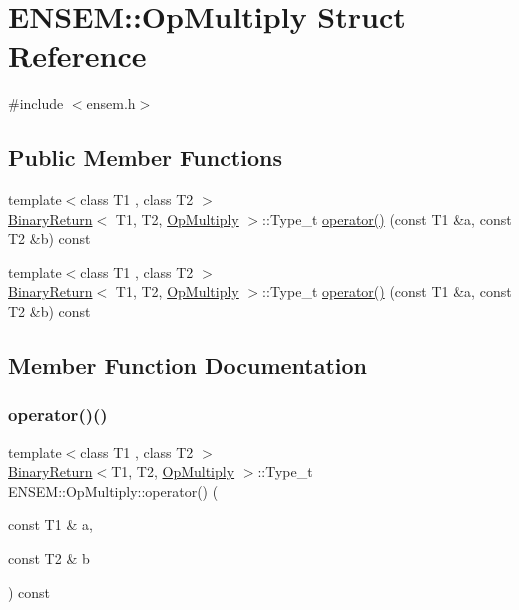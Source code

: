 \hypertarget{structENSEM_1_1OpMultiply}{}\section{E\+N\+S\+EM\+:\+:Op\+Multiply Struct Reference}
\label{structENSEM_1_1OpMultiply}


{\ttfamily \#include $<$ensem.\+h$>$}

\subsection*{Public Member Functions}
\begin{DoxyCompactItemize}
\item 
{\footnotesize template$<$class T1 , class T2 $>$ }\\\mbox{\hyperlink{structENSEM_1_1BinaryReturn}{Binary\+Return}}$<$ T1, T2, \mbox{\hyperlink{structENSEM_1_1OpMultiply}{Op\+Multiply}} $>$\+::Type\+\_\+t \mbox{\hyperlink{structENSEM_1_1OpMultiply_ae4e6438a01cae970041fa80c1cb6b594}{operator()}} (const T1 \&a, const T2 \&b) const
\item 
{\footnotesize template$<$class T1 , class T2 $>$ }\\\mbox{\hyperlink{structENSEM_1_1BinaryReturn}{Binary\+Return}}$<$ T1, T2, \mbox{\hyperlink{structENSEM_1_1OpMultiply}{Op\+Multiply}} $>$\+::Type\+\_\+t \mbox{\hyperlink{structENSEM_1_1OpMultiply_ae4e6438a01cae970041fa80c1cb6b594}{operator()}} (const T1 \&a, const T2 \&b) const
\end{DoxyCompactItemize}


\subsection{Member Function Documentation}
\mbox{\label{structENSEM_1_1OpMultiply_ae4e6438a01cae970041fa80c1cb6b594}} 
\subsubsection{\texorpdfstring{operator()()}{operator()()}\hspace{0.1cm}{\footnotesize\ttfamily [1/2]}}
{\footnotesize\ttfamily template$<$class T1 , class T2 $>$ \\
\mbox{\hyperlink{structENSEM_1_1BinaryReturn}{Binary\+Return}}$<$T1, T2, \mbox{\hyperlink{structENSEM_1_1OpMultiply}{Op\+Multiply}} $>$\+::Type\+\_\+t E\+N\+S\+E\+M\+::\+Op\+Multiply\+::operator() (\begin{DoxyParamCaption}\item[{const T1 \&}]{a,  }\item[{const T2 \&}]{b }\end{DoxyParamCaption}) const\hspace{0.3cm}{\ttfamily [inline]}}

